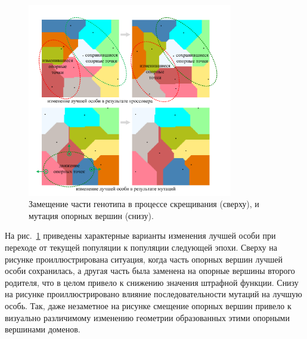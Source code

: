\begin{figure}[ht]
\centering
\includegraphics[width=0.8\textwidth]{./pics/text_2_genetic/changes.pdf}
\caption{Замещение части генотипа в процессе скрещивания (сверху), и мутация опорных вершин (снизу).}
\label{fig:text_2_genetic_changes}
\end{figure}

На рис.~\ref{fig:text_2_genetic_changes} приведены характерные варианты изменения лучшей особи при переходе от текущей популяции к популяции следующей эпохи.
Сверху на рисунке проиллюстрирована ситуация, когда часть опорных вершин лучшей особи сохранилась, а другая часть была заменена на опорные вершины второго родителя, что в целом привело к снижению значения штрафной функции.
Снизу на рисунке проиллюстрировано влияние последовательности мутаций на лучшую особь.
Так, даже незаметное на рисунке смещение опорных вершин привело к визуально различимому изменению геометрии образованных этими опорными вершинами доменов.

